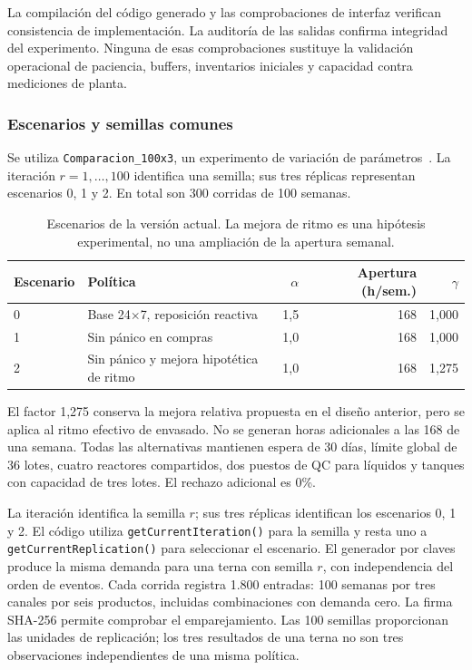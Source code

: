 \documentclass[11pt, a4paper]{article}
\begin{document}
La compilación del código generado y las comprobaciones de interfaz verifican consistencia de implementación. La auditoría de las salidas confirma integridad del experimento. Ninguna de esas comprobaciones sustituye la validación operacional de paciencia, buffers, inventarios iniciales y capacidad contra mediciones de planta.

\subsubsection{Escenarios y semillas comunes}
Se utiliza \texttt{Comparacion\_100x3}, un experimento de variación de parámetros~\cite{anylogic-paramvariation}. La iteración $r=1,\ldots,100$ identifica una semilla; sus tres réplicas representan escenarios 0, 1 y 2. En total son 300 corridas de 100 semanas.

\begin{table}[htbp]
\centering\small
\caption{Escenarios de la versión actual. La mejora de ritmo es una hipótesis experimental, no una ampliación de la apertura semanal.}
\label{tab:escenarios}
\begin{tabularx}{\textwidth}{lXrrr}
\toprule
Escenario & Política & $\alpha$ & Apertura (h/sem.) & $\gamma$ \\
\midrule
0 & Base 24$\times$7, reposición reactiva & 1,5 & 168 & 1,000 \\
1 & Sin pánico en compras & 1,0 & 168 & 1,000 \\
2 & Sin pánico y mejora hipotética de ritmo & 1,0 & 168 & 1,275 \\
\bottomrule
\end{tabularx}
\end{table}

El factor 1,275 conserva la mejora relativa propuesta en el diseño anterior, pero se aplica al ritmo efectivo de envasado. No se generan horas adicionales a las 168 de una semana. Todas las alternativas mantienen espera de 30 días, límite global de 36 lotes, cuatro reactores compartidos, dos puestos de QC para líquidos y tanques con capacidad de tres lotes. El rechazo adicional es 0\%.

La iteración identifica la semilla $r$; sus tres réplicas identifican los escenarios 0, 1 y 2. El código utiliza \texttt{getCurrentIteration()} para la semilla y resta uno a \texttt{getCurrentReplication()} para seleccionar el escenario. El generador por claves produce la misma demanda para una terna con semilla $r$, con independencia del orden de eventos. Cada corrida registra 1.800 entradas: 100 semanas por tres canales por seis productos, incluidas combinaciones con demanda cero. La firma SHA-256 permite comprobar el emparejamiento. Las 100 semillas proporcionan las unidades de replicación; los tres resultados de una terna no son tres observaciones independientes de una misma política.
\end{document}

